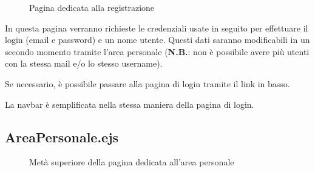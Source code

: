 \begin{figure}[ht]
    \centering
    \caption{Pagina dedicata alla registrazione}
\end{figure}

In questa pagina verranno richieste le credenziali usate in seguito per effettuare il login (email e password) e un nome utente. 
Questi dati saranno modificabili in un secondo momento tramite l'area personale (\textbf{N.B.}: non è possibile avere più utenti con 
la stessa mail e/o lo stesso username).\\

\vspace{5mm}

Se necessario, è possibile passare alla pagina di login tramite il link in basso.\\

\vspace{5mm}

La navbar è semplificata nella stessa maniera della pagina di login.

\subsection{AreaPersonale.ejs}

\begin{figure}[ht]
    \centering
    \caption{Metà superiore della pagina dedicata all'area personale}
\end{figure}

